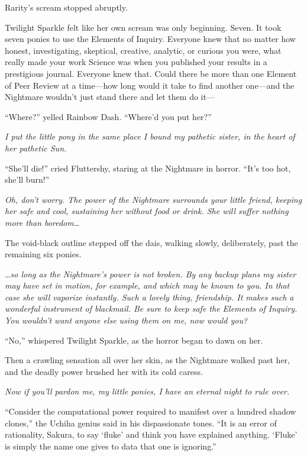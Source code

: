 Rarity’s scream stopped abruptly.

Twilight Sparkle felt like her own scream was only beginning. Seven. It took seven ponies to use the Elements of Inquiry. Everyone knew that no matter how honest, investigating, skeptical, creative, analytic, or curious you were, what really made your work Science was when you published your results in a prestigious journal. Everyone knew that. Could there be more than one Element of Peer Review at a time—how long would it take to find another one—and the Nightmare wouldn’t just stand there and let them do it—

“Where?” yelled Rainbow Dash. “Where’d you put her?”

\emph{I put the little pony in the same place I bound my pathetic sister, in the heart of her pathetic Sun.}

“She’ll die!” cried Fluttershy, staring at the Nightmare in horror. “It’s too hot, she’ll burn!”

\emph{Oh, don’t worry. The power of the Nightmare surrounds your little friend, keeping her safe and cool, sustaining her without food or drink. She will suffer nothing more than boredom…}

The void-black outline stepped off the dais, walking slowly, deliberately, past the remaining six ponies.

\emph{…so long as the Nightmare’s power is not broken. By any backup plans my sister may have set in motion, for example, and which may be known to you. In that case she will vaporize instantly. Such a lovely thing, friendship. It makes such a wonderful instrument of blackmail. Be sure to keep safe the Elements of Inquiry. You wouldn’t want anyone else using them on me, now would you?}

“No,” whispered Twilight Sparkle, as the horror began to dawn on her.

Then a crawling sensation all over her skin, as the Nightmare walked past her, and the deadly power brushed her with its cold caress.

\emph{Now if you’ll pardon me, my little ponies, I have an eternal night to rule over.}

\clearpage
{}

“Consider the computational power required to manifest over a hundred shadow clones,” the Uchiha genius said in his dispassionate tones. “It is an error of rationality, Sakura, to say ‘fluke’ and think you have explained anything. ‘Fluke’ is simply the name one gives to data that one is ignoring.”

